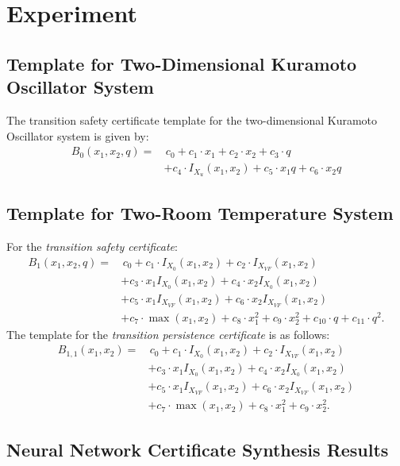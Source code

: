 \section{Experiment}
\label{appendix-experiment}
\subsection{Template for Two-Dimensional Kuramoto Oscillator System}
The transition safety certificate template for the two-dimensional Kuramoto Oscillator system is given by:
\begin{align*}
B_0(x_1, x_2, q) = &\, c_0 + c_1 \cdot x_1 + c_2 \cdot x_2 + c_3 \cdot q \\
                   &+ c_4 \cdot I_{X_u}(x_1, x_2) + c_5 \cdot x_1 q + c_6 \cdot x_2 q
\end{align*}

\subsection{Template for Two-Room Temperature System}
For the \textit{transition safety certificate}:
\begin{align*}
B_1(x_1, x_2, q) = &\, c_0 + c_1 \cdot I_{X_0}(x_1, x_2) + c_2 \cdot I_{X_{VF}}(x_1, x_2) \\
                   &+ c_3 \cdot x_1 I_{X_0}(x_1, x_2) + c_4 \cdot x_2 I_{X_0}(x_1, x_2) \\
                   &+ c_5 \cdot x_1 I_{X_{VF}}(x_1, x_2) + c_6 \cdot x_2 I_{X_{VF}}(x_1, x_2) \\
                   &+ c_7 \cdot \max(x_1, x_2) + c_8 \cdot x_1^2 + c_9 \cdot x_2^2 + c_{10} \cdot q + c_{11} \cdot q^2.
\end{align*}
The template for the \textit{transition persistence certificate} is as follows:
\begin{align*}
B_{1,1}(x_1, x_2) = & \, c_0 + c_1 \cdot I_{X_0}(x_1, x_2) + c_2 \cdot I_{X_{VF}}(x_1, x_2) \\
                    & + c_3 \cdot x_1 I_{X_0}(x_1, x_2) + c_4 \cdot x_2 I_{X_0}(x_1, x_2) \\
                    & + c_5 \cdot x_1 I_{X_{VF}}(x_1, x_2) + c_6 \cdot x_2 I_{X_{VF}}(x_1, x_2) \\ 
                    & + c_7 \cdot \max(x_1, x_2) + c_8 \cdot x_1^2 + c_9 \cdot x_2^2.
\end{align*}

\subsection{Neural Network Certificate Synthesis Results}
\label{app:neural_cert_results}

